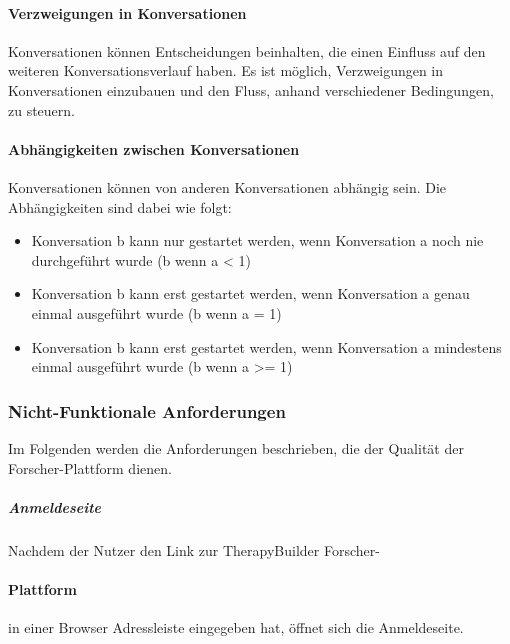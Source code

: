 \paragraph{Verzweigungen in Konversationen}
Konversationen können Entscheidungen beinhalten, die einen Einfluss auf den weiteren Konversationsverlauf haben. Es ist möglich, Verzweigungen in Konversationen einzubauen und den Fluss, anhand verschiedener Bedingungen, zu steuern. 

\paragraph{Abhängigkeiten zwischen Konversationen}
Konversationen können von anderen Konversationen abhängig sein. Die Abhängigkeiten sind dabei wie folgt:
\begin{itemize}
\item Konversation b kann nur gestartet werden, wenn Konversation a noch nie durchgeführt wurde (b wenn a < 1)
\item Konversation b kann erst gestartet werden, wenn Konversation a genau einmal ausgeführt wurde (b wenn a = 1)
\item Konversation b kann erst gestartet werden, wenn Konversation a mindestens einmal ausgeführt wurde (b wenn a >= 1)  
\end{itemize} 

\subsubsection{Nicht-Funktionale Anforderungen}
Im Folgenden werden die Anforderungen beschrieben, die der Qualität der Forscher-Plattform dienen.

\subparagraph{Anmeldeseite} Nachdem der Nutzer den Link zur TherapyBuilder Forscher-\paragraph{Plattform} in einer Browser Adressleiste eingegeben hat, öffnet sich die Anmeldeseite.


